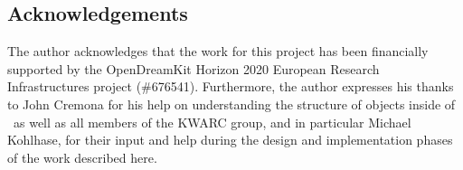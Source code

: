\subsection{Acknowledgements}\label{sec:conclusion:outlook:acknowledgements}

The author acknowledges that the work for this project has been financially supported by the OpenDreamKit Horizon 2020 European Research Infrastructures project (\#676541). 
Furthermore, the author expresses his thanks to John Cremona for his help on understanding the structure of objects inside of \lmfdb\ as well as all members of the KWARC group, and in particular Michael Kohlhase, for their input and help during the design and implementation phases of the work described here. 